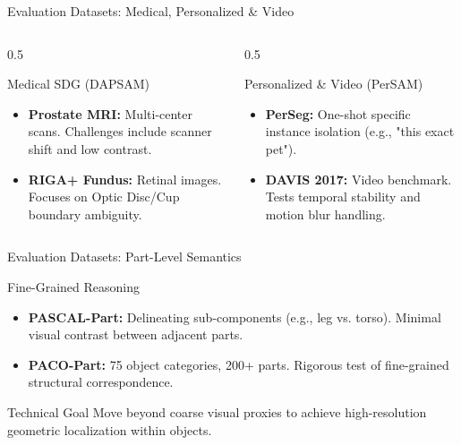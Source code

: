 \documentclass[aspectratio=169, 10pt]{beamer}
\begin{document}
\begin{frame}{Evaluation Datasets: Medical, Personalized \& Video}
    \begin{columns}[T]
        \begin{column}{0.5\textwidth}
            \begin{block}{Medical SDG (DAPSAM)}
                \small
                \begin{itemize}
                    \item \textbf{Prostate MRI:} Multi-center scans. Challenges include scanner shift and low contrast.
                    \item \textbf{RIGA+ Fundus:} Retinal images. Focuses on Optic Disc/Cup boundary ambiguity.
                \end{itemize}
            \end{block}
        \end{column}
        \begin{column}{0.5\textwidth}
            \begin{block}{Personalized \& Video (PerSAM)}
                \small
                \begin{itemize}
                    \item \textbf{PerSeg:} One-shot specific instance isolation (e.g., "this exact pet").
                    \item \textbf{DAVIS 2017:} Video benchmark. Tests temporal stability and motion blur handling.
                \end{itemize}
            \end{block}
        \end{column}
    \end{columns}
\end{frame}

\begin{frame}{Evaluation Datasets: Part-Level Semantics}
    \begin{block}{Fine-Grained Reasoning}
        \small
        \begin{itemize}
            \item \textbf{PASCAL-Part:} Delineating sub-components (e.g., leg vs. torso). Minimal visual contrast between adjacent parts.
            \item \textbf{PACO-Part:} 75 object categories, 200+ parts. Rigorous test of fine-grained structural correspondence.
        \end{itemize}
    \end{block}
    \centering
    \begin{alertblock}{Technical Goal}
        Move beyond coarse visual proxies to achieve high-resolution geometric localization within objects.
    \end{alertblock}
\end{frame}
\end{document}

